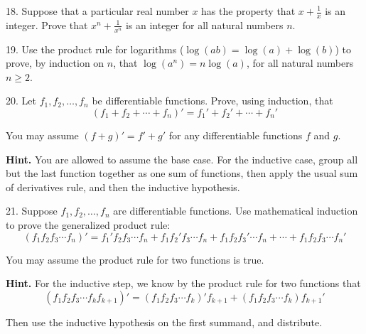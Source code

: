 \documentclass[12pt,]{book}
\theoremstyle{plain}
\theoremstyle{definition}
\theoremstyle{definition}
\theoremstyle{definition}
\numberwithin{equation}{chapter}
\begin{document}
\begin{exerciselist}
\par\smallskip
\item[18.]\hypertarget{exercise-62}{}\hypertarget{p-496}{}%
Suppose that a particular real number \(x\) has the property that \(x + \frac{1}{x}\) is an integer. Prove that \(x^n + \frac{1}{x^n}\) is an integer for all natural numbers \(n\).%
\par\smallskip
\item[19.]\hypertarget{exercise-63}{}\hypertarget{p-499}{}%
Use the product rule for logarithms (\(\log(ab) = \log(a) + \log(b)\)) to prove, by induction on \(n\), that \(\log(a^n) = n \log(a)\), for all natural numbers \(n \ge 2\).%
\par\smallskip
\item[20.]\hypertarget{exercise-64}{}\hypertarget{p-502}{}%
Let \(f_1, f_2,\ldots, f_n\) be differentiable functions. Prove, using induction, that%
\begin{equation*}
(f_1 + f_2 + \cdots + f_n)' = f_1' + f_2' + \cdots + f_n'
\end{equation*}
%
\par
\hypertarget{p-503}{}%
You may assume \((f+g)' = f' + g'\) for any differentiable functions \(f\) and \(g\).%
\par\smallskip
\par\smallskip%
\noindent\textbf{Hint.}\hypertarget{hint-1}{}\quad%
\hypertarget{p-504}{}%
You are allowed to assume the base case. For the inductive case, group all but the last function together as one sum of functions, then apply the usual sum of derivatives rule, and then the inductive hypothesis.%
\item[21.]\hypertarget{exercise-65}{}\hypertarget{p-505}{}%
Suppose \(f_1, f_2, \ldots, f_n\) are differentiable functions. Use mathematical induction to prove the generalized product rule:%
\begin{equation*}
(f_1 f_2 f_3 \cdots f_n)' = f_1' f_2 f_3 \cdots f_n + f_1 f_2' f_3 \cdots f_n + f_1 f_2 f_3' \cdots f_n + \cdots + f_1 f_2 f_3 \cdots f_n'
\end{equation*}
%
\par
\hypertarget{p-506}{}%
You may assume the product rule for two functions is true.%
\par\smallskip
\par\smallskip%
\noindent\textbf{Hint.}\hypertarget{hint-2}{}\quad%
\hypertarget{p-507}{}%
For the inductive step, we know by the product rule for two functions that%
\begin{equation*}
(f_1f_2f_3 \cdots f_k f_{k+1})' = (f_1f_2f_3\cdots f_k)'f_{k+1} + (f_1f_2f_3\cdots f_k)f_{k+1}'
\end{equation*}
%
\par
\hypertarget{p-508}{}%
Then use the inductive hypothesis on the first summand, and distribute.%
\end{exerciselist}
\typeout{************************************************}
\typeout{************************************************}
\end{document}
